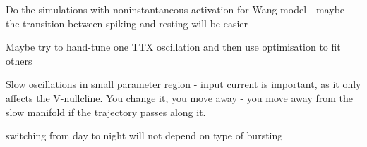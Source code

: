 \documentclass[../main.tex]{subfiles}
\begin{document}
Do the simulations with noninstantaneous activation for Wang model - maybe the transition between
spiking and resting will be easier

Maybe try to hand-tune one TTX oscillation and then use optimisation to fit others

Slow oscillations in small parameter region - input current is important, as it only affects the V-nullcline. You change it, you move away - you move away from the slow manifold if the trajectory passes along it.

switching from day to night will not depend on type of bursting



\end{document}
